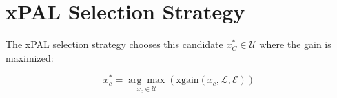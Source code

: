 \section{xPAL Selection Strategy}

The xPAL selection strategy chooses this candidate $x^*_C \in \mathcal{U}$ where the gain is maximized:

\begin{equation}
    x^*_c = \underset{x_c \in \mathcal{U}}{\arg \max} \left( \text{xgain} (x_c, \mathcal{L}, \mathcal{E}) \right)
\end{equation}
